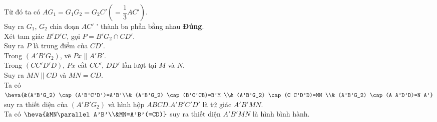 \begin{ex}
{\begin{itemchoice}
			Từ  đó ta có $AG_1=G_1 G_2=G_2 C'\left(=\dfrac{1}{3}AC'\right)$.\\
			Suy ra $G_1$, $G_2$ chia đoạn $AC'$ ' thành ba  phần bằng nhau
			\itemch \textbf{Đúng}.\\ 
			Xét tam  giác $B'D'C$, gọi $P=B'G_2\cap CD'$.\\
			Suy ra $P$ là trung điểm của  $CD'$.\\
			Trong $(A'B'G_2)$, vẽ $Px\parallel A'B'$.\\ 
			Trong $(CC'D'D)$, $Px$ cắt $CC'$, $DD'$ lần lượt tại $M$  và $N$.\\
			Suy ra $MN\parallel  CD$ và $MN=CD$.\\
			Ta có $\heva{&(A'B'G_2) \cap(A'B'C'D')=A'B'\\& (A'B'G_2) \cap(B'C'CB)=B'M \\& (A'B'G_2)  \cap(C C'D'D)=MN \\& (A'B'G_2) \cap(A A'D'D)=N A'}$
			suy ra thiết diện của $(A'B'G_2)$  và hình hộp $ABCD.A'B'C'D'$ là tứ giác $A'B'MN$.\\
			Ta  có $\heva{&MN\parallel A'B'\\&MN=A'B'(=CD)}$ suy ra thiết diện $A'B'MN$ là hình bình hành.
		\end{itemchoice}
	} 
\end{ex}

